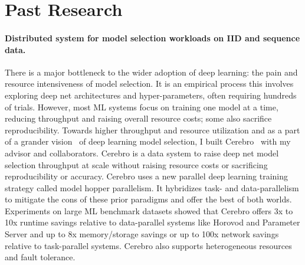 \documentclass[letterpaper]{article}
\begin{document}
\section*{Past Research}


\paragraph{Distributed system for model selection workloads on IID and sequence data.} There is a major bottleneck to the wider adoption of deep learning: the pain and resource intensiveness of model selection. It is an empirical process this involves exploring deep net architectures and hyper-parameters, often requiring hundreds of trials. However, most ML systems focus on training one model at a time, reducing throughput and raising overall resource costs; some also sacrifice reproducibility. Towards higher throughput and resource utilization and as a part of a grander vision~\cite{cerebrocidr} of deep learning model selection, I built Cerebro~\cite{cerebro} with my advisor and collaborators. Cerebro is a data system to raise deep net model selection throughput at scale without raising resource costs or sacrificing reproducibility or accuracy. Cerebro uses a new parallel deep learning training strategy called model hopper parallelism. It hybridizes task- and data-parallelism to mitigate the cons of these prior paradigms and offer the best of both worlds. Experiments on large ML benchmark datasets showed that Cerebro offers 3x to 10x runtime savings relative to data-parallel systems like Horovod and Parameter Server and up to 8x memory/storage savings or up to 100x network savings relative to task-parallel systems. Cerebro also supports heterogeneous resources and fault tolerance.
\end{document}
